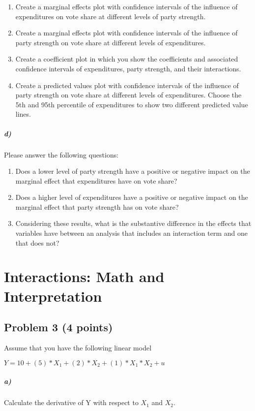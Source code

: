 \documentclass[12pt]{article}
\begin{document}
\begin{enumerate}
	\item Create a marginal effects plot with confidence intervals of the influence of expenditures on vote share at different levels of party strength.
	\item Create a marginal effects plot with confidence intervals of the influence of party strength on vote share at different levels of expenditures.
	\item Create a coefficient plot in which you show the coefficients and associated confidence intervals of expenditures, party strength, and their interactions.
	\item Create a predicted values plot with confidence intervals of the influence of party strength on vote share at different levels of expenditures. Choose the 5th and 95th percentile of expenditures to show two different predicted value lines.
\end{enumerate}

\subparagraph{d)} Please answer the following questions:

\begin{enumerate}
	\item Does a lower level of party strength have a positive or negative impact on the marginal effect that expenditures have on vote share?
	\item Does a higher level of expenditures have a positive or negative impact on the marginal effect that party strength has on vote share?
	\item Considering these results, what is the substantive difference in the effects that variables have between an analysis that includes an interaction term and one that does not?
\end{enumerate}



\section*{Interactions: Math and Interpretation}

\subsection*{Problem 3 (4 points)}

Assume that you have the following linear model

$Y = 10 + (5) * X_1 + (2) * X_2 + (1) * X_1 * X_2 + u$

\subparagraph{a)} Calculate the derivative of Y with respect to $X_1$ and $X_2$.
\end{document}
